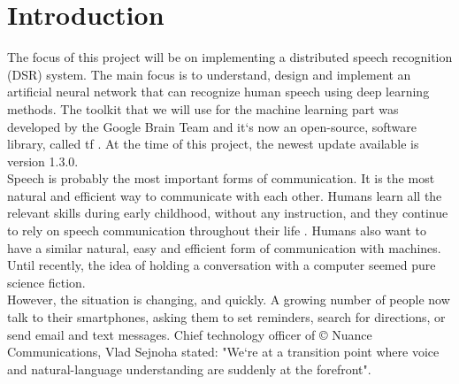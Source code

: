 \chapter{Introduction}\label{ch:introduction}

The focus of this project will be on implementing a distributed speech recognition (DSR) system.
The main focus is to understand, design and implement an artificial neural network that can recognize human speech using deep learning methods.
The toolkit that we will use for the machine learning part was developed by the Google Brain Team and it`s now an open-source, software library, called \acrfull{tf} \cite{tensorflow2015-whitepaper}.
At the time of this project, the newest update available is version 1.3.0.\\

Speech is probably the most important forms of communication.
It is the most natural and efficient way to communicate with
each other. Humans learn all the relevant skills during early
childhood, without any instruction, and they continue to rely
on speech communication throughout their life \cite{kamblespeech}.
Humans also want to have a similar natural, easy and efficient form of communication with machines. 
Until recently, the idea of holding a conversation with a computer seemed pure science fiction.\\

However, the situation is changing, and quickly.
A growing number of people now talk to their smartphones, asking them to set reminders, search for directions, or send email and text messages.
Chief technology officer of \copyright{} Nuance Communications, Vlad Sejnoha stated: "We`re at a transition point where voice and natural-language understanding are suddenly at the forefront".\cite{kamblespeech}
 






